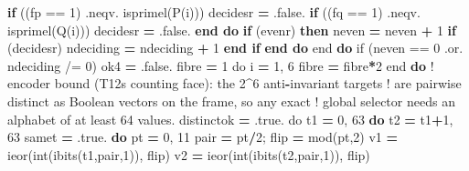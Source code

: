 \documentclass[10pt]{article}
\renewcommand{\_}{\origunderscore\allowbreak}
\newenvironment{Shaded}{}{}
\newcommand{\BuiltInTok}[1]{#1}
\newcommand{\ConstantTok}[1]{#1}
\newcommand{\DecValTok}[1]{#1}
\newcommand{\FunctionTok}[1]{#1}
\newcommand{\KeywordTok}[1]{\textbf{#1}}
\newcommand{\NormalTok}[1]{#1}
\newcommand{\OperatorTok}[1]{#1}
\newcommand{\StringTok}[1]{#1}
\begin{document}
\begin{Shaded}
\begin{Highlighting}[]
              \KeywordTok{if}\NormalTok{ ((fp }\OperatorTok{==} \DecValTok{1}\NormalTok{) }\OperatorTok{.neqv.}\NormalTok{ isprime\_l(P(i))) decides\_r }\KeywordTok{=} \ConstantTok{.false.}
              \KeywordTok{if}\NormalTok{ ((fq }\OperatorTok{==} \DecValTok{1}\NormalTok{) }\OperatorTok{.neqv.}\NormalTok{ isprime\_l(Q(i))) decides\_r }\KeywordTok{=} \ConstantTok{.false.}
           \KeywordTok{end do}
           \KeywordTok{if}\NormalTok{ (even\_r) }\KeywordTok{then}
\NormalTok{              n\_even }\KeywordTok{=}\NormalTok{ n\_even }\KeywordTok{+} \DecValTok{1}
              \KeywordTok{if}\NormalTok{ (decides\_r) n\_deciding }\KeywordTok{=}\NormalTok{ n\_deciding }\KeywordTok{+} \DecValTok{1}
           \KeywordTok{end if}
        \KeywordTok{end do}
\BuiltInTok{     e}\NormalTok{nd }\KeywordTok{do}
\BuiltInTok{     i}\NormalTok{f (n\_even }\OperatorTok{==} \DecValTok{0} \OperatorTok{.or.}\NormalTok{ n\_deciding }\OperatorTok{/=} \DecValTok{0}\NormalTok{) ok4 }\KeywordTok{=} \ConstantTok{.false.}
\BuiltInTok{     f}\NormalTok{ibre }\KeywordTok{=} \DecValTok{1}
\BuiltInTok{     d}\NormalTok{o i }\KeywordTok{=} \DecValTok{1}\NormalTok{, }\DecValTok{6}
\NormalTok{        fibre }\KeywordTok{=}\NormalTok{ fibre}\KeywordTok{*}\DecValTok{2}
\BuiltInTok{     e}\NormalTok{nd }\KeywordTok{do}
\BuiltInTok{     !}\NormalTok{ encoder bound (T12}\StringTok{\textquotesingle{}}\NormalTok{s counting face): the }\DecValTok{2}\KeywordTok{\^{}}\DecValTok{6}\NormalTok{ anti}\KeywordTok{{-}}\NormalTok{invariant targets}
\BuiltInTok{     !}\NormalTok{ are pairwise distinct as Boolean vectors on the frame, so }\FunctionTok{any}\NormalTok{ exact}
\BuiltInTok{     !}\NormalTok{ global selector needs an alphabet of at least }\DecValTok{64}\NormalTok{ values.}
\BuiltInTok{     d}\NormalTok{istinct\_ok }\KeywordTok{=} \ConstantTok{.true.}
\BuiltInTok{     d}\NormalTok{o t1 }\KeywordTok{=} \DecValTok{0}\NormalTok{, }\DecValTok{63}
        \KeywordTok{do}\NormalTok{ t2 }\KeywordTok{=}\NormalTok{ t1}\KeywordTok{+}\DecValTok{1}\NormalTok{, }\DecValTok{63}
\NormalTok{           same\_t }\KeywordTok{=} \ConstantTok{.true.}
           \KeywordTok{do}\NormalTok{ pt }\KeywordTok{=} \DecValTok{0}\NormalTok{, }\DecValTok{11}
\NormalTok{              pair }\KeywordTok{=}\NormalTok{ pt}\KeywordTok{/}\DecValTok{2}\NormalTok{; flip }\KeywordTok{=} \BuiltInTok{mod}\NormalTok{(pt,}\DecValTok{2}\NormalTok{)}
\NormalTok{              v1 }\KeywordTok{=} \BuiltInTok{ieor}\NormalTok{(}\BuiltInTok{int}\NormalTok{(}\BuiltInTok{ibits}\NormalTok{(t1,pair,}\DecValTok{1}\NormalTok{)), flip)}
\NormalTok{              v2 }\KeywordTok{=} \BuiltInTok{ieor}\NormalTok{(}\BuiltInTok{int}\NormalTok{(}\BuiltInTok{ibits}\NormalTok{(t2,pair,}\DecValTok{1}\NormalTok{)), flip)}

\end{Highlighting}
\end{Shaded}
\end{document}
